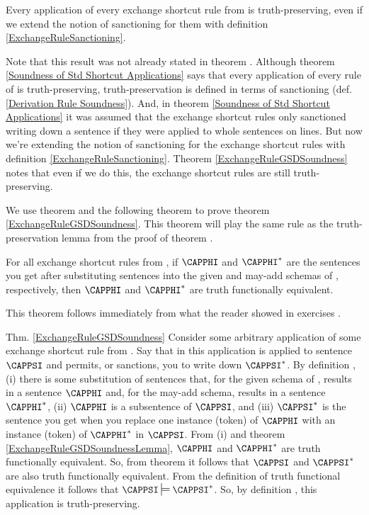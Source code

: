 \begin{THEOREM}{}
Every application of every exchange shortcut rule from \GSDP{} is truth-preserving, even if we extend the notion of sanctioning for them with definition \ref{ExchangeRuleSanctioning}. 
\end{THEOREM} 
\noindent{}Note that this result was not already stated in theorem . 
Although theorem \ref{Soundness of Std Shortcut Applications} says that every application of every rule of \GSDP{} is truth-preserving, truth-preservation is defined in terms of sanctioning (def. \ref{Derivation Rule Soundness}).
And, in theorem \ref{Soundness of Std Shortcut Applications} it was assumed that the exchange shortcut rules only sanctioned writing down a sentence if they were applied to whole sentences on lines. 
But now we're extending the notion of sanctioning for the exchange shortcut rules with definition \ref{ExchangeRuleSanctioning}. 
Theorem \ref{ExchangeRuleGSDSoundness} notes that even if we do this, the exchange shortcut rules are still truth-preserving.

We use theorem  and the following theorem to prove theorem \ref{ExchangeRuleGSDSoundness}. This theorem will play the same rule as the truth-preservation lemma from the proof of theorem .
\begin{THEOREM}{}
For all exchange shortcut rules  from \GSDP{}, if $\CAPPHI$ and $\CAPPHI^*$ are the sentences you get after substituting \GSL{} sentences into the given and may-add schemas of , respectively, then $\CAPPHI$ and $\CAPPHI^*$ are truth functionally equivalent. 
\end{THEOREM}
\begin{PROOF}
This theorem follows immediately from what the reader showed in exercises . 
\end{PROOF}
\begin{PROOFOF}{Thm. \ref{ExchangeRuleGSDSoundness}}
Consider some arbitrary application of some exchange shortcut rule  from \GSDP{}. 
Say that in this application  is applied to sentence $\CAPPSI$ and permits, or sanctions, you to write down $\CAPPSI^*$. 
By definition , (i) there is some substitution of \GSL{} sentences that, for the given schema of , results in a sentence $\CAPPHI$ and, for the may-add schema, results in a sentence $\CAPPHI^*$, (ii) $\CAPPHI$ is a subsentence of $\CAPPSI$, and (iii) $\CAPPSI^*$ is the \GSL{} sentence you get when you replace one instance (token) of $\CAPPHI$ with an instance (token) of $\CAPPHI^*$ in $\CAPPSI$. 
From (i) and theorem \ref{ExchangeRuleGSDSoundnessLemma}, $\CAPPHI$ and $\CAPPHI^*$ are truth functionally equivalent.
So, from theorem  it follows that $\CAPPSI$ and $\CAPPSI^*$ are also truth functionally equivalent.
From the definition  of truth functional equivalence it follows that $\CAPPSI\sdtstile{}{}\CAPPSI^*$.
So, by definition , this application is truth-preserving. 
\end{PROOFOF}

